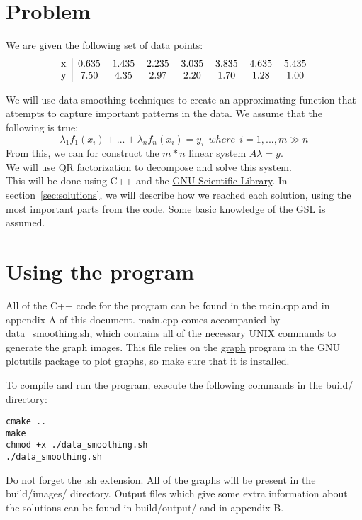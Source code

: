 \documentclass[11pt, a4paper, titlepage, openright]{article}
\begin{document}

\tableofcontents
\newpage

\section{Problem}
    We are given the following set of data points:
    \[
    \begin{tabular}{l | *{7}{c}}
        x & 0.635 & 1.435 & 2.235 & 3.035 & 3.835 & 4.635 & 5.435 \\
        y & 7.50  & 4.35  & 2.97  & 2.20  & 1.70  & 1.28  & 1.00 \\
    \end{tabular}
    \]

    We will use data smoothing techniques to create an approximating function that attempts to capture important patterns in the data.
    We assume that the following is true:
    \[ \lambda_1 f_1(x_i) + ... +  \lambda_n f_n(x_i) = y_i \ \ where \ \ i = 1,...,m \gg n \]
    From this, we can for construct the \(m * n \) linear system \(A\lambda = y \). \\
    We will use QR factorization to decompose and solve this system.\\

    This will be done using C++ and the \href{http://www.gnu.org/software/gsl/}{GNU Scientific Library}.
    In section~\ref{sec:solutions}, we will describe how we reached each solution, using the 
    most important parts from the code. Some basic knowledge of the GSL is assumed.

\bigskip
\bigskip
\section{Using the program}
    All of the C++ code for the program can be found in the main.cpp and in appendix A of this document.
    main.cpp comes accompanied by \mbox{data\_smoothing.sh}, which contains all of the necessary UNIX commands to generate the graph images.
    This file relies on the \href{https://www.gnu.org/software/plotutils/manual/en/html_node/graph.html}{graph} program
    in the GNU plotutils package to plot graphs, so make sure that it is installed.

    To compile and run the program, execute the following commands in the build/ directory:
\begin{lstlisting}
cmake ..
make
chmod +x ./data_smoothing.sh
./data_smoothing.sh
\end{lstlisting}
    Do not forget the .sh extension. All of the graphs will be present in the build/images/ directory. Output files which give some extra information 
    about the solutions can be found in build/output/ and in appendix B.
    
\end{document}
